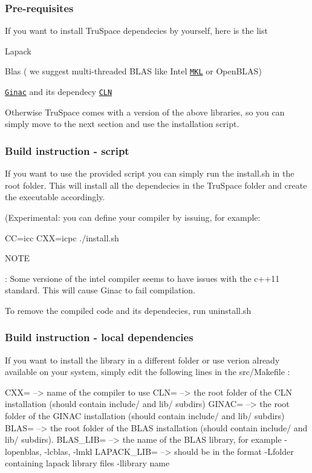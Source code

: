 \subsubsection*{Pre-\/requisites}

If you want to install Tru\+Space dependecies by yourself, here is the list


\begin{DoxyItemize}
\item Lapack
\item Blas ( we suggest multi-\/threaded B\+L\+AS like Intel \href{https://software.intel.com/en-us/intel-mkl}{\tt M\+KL} or Open\+B\+L\+AS)
\item \href{http://www.ginac.de/}{\tt Ginac} and its dependecy \href{http://www.ginac.de/CLN/}{\tt C\+LN}
\end{DoxyItemize}

Otherwise Tru\+Space comes with a version of the above libraries, so you can simply move to the next section and use the installation script.

\subsubsection*{Build instruction -\/ script}

If you want to use the provided script you can simply run the {\ttfamily install.\+sh} in the root folder. This will install all the dependecies in the Tru\+Space folder and create the executable accordingly.

(Experimental\+: you can define your compiler by issuing, for example\+: \begin{DoxyVerb}CC=icc CXX=icpc ./install.sh
\end{DoxyVerb}


N\+O\+TE

\+: Some versione of the intel compiler seems to have issues with the c++11 standard. This will cause Ginac to fail compilation.

To remove the compiled code and its dependecies, run {\ttfamily uninstall.\+sh}

\subsubsection*{Build instruction -\/ local dependencies}

If you want to install the library in a different folder or use verion already available on your system, simply edit the following lines in the {\ttfamily src/\+Makefile} \+: \begin{DoxyVerb}CXX=                          --> name of the compiler to use
CLN=                          --> the root folder of the CLN installation (should contain include/ and lib/ subdirs)
GINAC=                        --> the root folder of the GINAC installation (should contain include/ and lib/ subdirs)
BLAS=                         --> the root folder of the BLAS installation (should contain include/ and lib/ subdirs). 
BLAS_LIB=                     --> the name of the BLAS library, for example -lopenblas, -lcblas, -lmkl
LAPACK_LIB=                   --> should be in the format -L{folder containing lapack library files} -l{library name}
\end{DoxyVerb}


